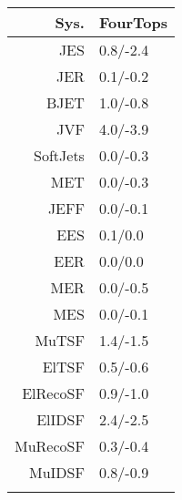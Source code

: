 \begin{tabular}{r|p{.08\linewidth}}
\toprule
 Sys.  & FourTops \\
\toprule
JES  & 0.8/-2.4 \\
JER  & 0.1/-0.2 \\
BJET  & 1.0/-0.8 \\
JVF  & 4.0/-3.9 \\
SoftJets  & 0.0/-0.3 \\
MET  & 0.0/-0.3 \\
JEFF  & 0.0/-0.1 \\
EES  & 0.1/0.0 \\
EER  & 0.0/0.0 \\
MER  & 0.0/-0.5 \\
MES  & 0.0/-0.1 \\
MuTSF  & 1.4/-1.5 \\
ElTSF  & 0.5/-0.6 \\
ElRecoSF  & 0.9/-1.0 \\
ElIDSF  & 2.4/-2.5 \\
MuRecoSF  & 0.3/-0.4 \\
MuIDSF  & 0.8/-0.9 \\
 \\
\bottomrule
\end{tabular}
